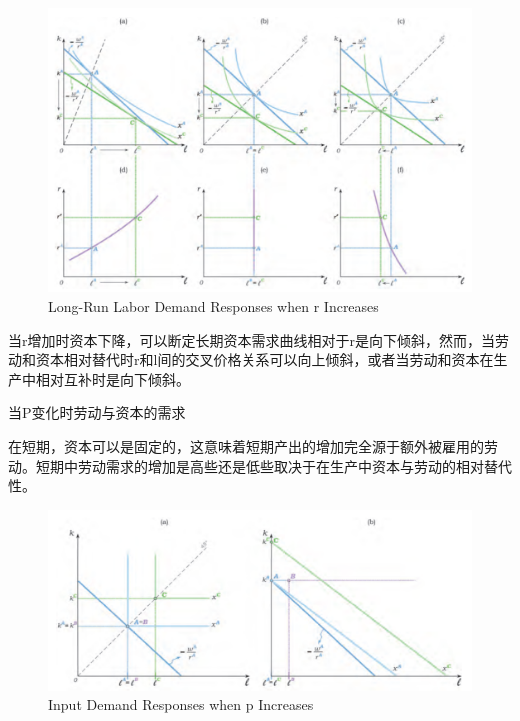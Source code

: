 \documentclass{article}
\begin{document}
\begin{figure}[H] %
	\centering %
	\includegraphics[width=1\textwidth]{13_10} %
	\caption{Long-Run Labor Demand Responses when r Increases} %
	\label{Fig.main11} %
\end{figure}

当r增加时资本下降，可以断定长期资本需求曲线相对于r是向下倾斜，然而，当劳动和资本相对替代时r和l间的交叉价格关系可以向上倾斜，或者当劳动和资本在生产中相对互补时是向下倾斜。

\hspace*{\fill}

当P变化时劳动与资本的需求

在短期，资本可以是固定的，这意味着短期产出的增加完全源于额外被雇用的劳动。短期中劳动需求的增加是高些还是低些取决于在生产中资本与劳动的相对替代性。

\begin{figure}[H] %
	\centering %
	\includegraphics[width=1\textwidth]{13_11} %
	\caption{Input Demand Responses when p Increases} %
	\label{Fig.main12} %
\end{figure}
\end{document}
